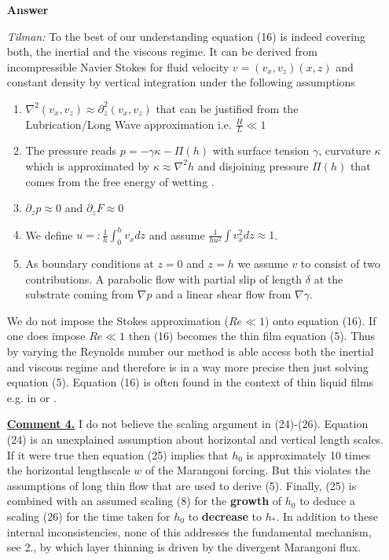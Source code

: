 \documentclass[12pt,english]{article}
\begin{document}
\begin{itemize}
\item[ \textbf{{Answer}}]
{

\emph{Tilman: }
    To the best of our understanding equation (16) is indeed covering both, the inertial and the viscous regime. It can be derived from incompressible Navier Stokes for fluid velocity $v=(v_x,v_z)(x,z)$ and constant density by vertical integration under the following assumptions
    \begin{enumerate}
        \item $\nabla^2 (v_x,v_z)\approx \partial_z^2 (v_x,v_z)$ that can be justified from the Lubrication/Long Wave approximation i.e. $\frac{H}{L}\ll 1$
        \item The pressure reads $p=-\gamma \kappa -\Pi(h)$ with surface tension $\gamma$, curvature $\kappa$ which is approximated by $\kappa\approx \nabla^2 h$ \cite{thiele_thermodynamically_2012}\cite{peschka_signatures_2019} and disjoining pressure $\Pi(h)$ that comes from the free energy of wetting \cite{thiele_thermodynamically_2012}\cite{peschka_signatures_2019}. 
        \item $\partial_z p \approx 0$ and $\partial_z F\approx 0$
        \item We define $u=:\frac{1}{h}\int_0^h v_x dz$ and assume $\frac{1}{hu^2}\int v_x^2 dz\approx 1$.
        \item As boundary conditions at $z=0$ and $z=h$ we assume $v$ to consist of two contributions. A parabolic flow with partial slip of length $\delta$ at the substrate coming from $\nabla p$ and a linear shear flow from $\nabla \gamma$. 
    \end{enumerate}
    We do not impose the Stokes approximation ($Re\ll 1$) onto equation (16). If one does impose $Re\ll 1$ then (16) becomes the thin film equation (5). Thus by varying the Reynolds number our method is able access both the inertial and viscous regime and therefore is in a way more precise then just solving equation (5). Equation (16) is often found in the context of thin liquid films e.g. in \cite{peschka_signatures_2019} or \cite{hack_self-similar_2020}.
}

\item[ \textbf{\underline{Comment 4.}}]
{
I do not believe the scaling argument in (24)-(26). 
Equation (24) is an unexplained assumption about horizontal and vertical length scales. 
If it were true then equation (25) implies that $h_0$ is approximately 10 times the horizontal lengthscale $w$ of the Marangoni forcing. 
But this violates the assumptions of long thin flow that are used to derive (5). 
Finally, (25) is combined with an assumed scaling (8) for the {\bf growth} of $h_0$ to deduce a scaling (26) for the time taken for $h_0$ to {\bf decrease} to $h_*$. 
In addition to these internal inconsistencies, none of this addresses the fundamental mechanism, see 2., by which layer thinning is driven by the divergent Marangoni flux.
}


\end{itemize}
\end{document}
